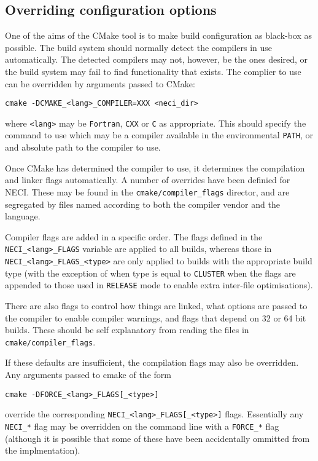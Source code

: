 \documentclass[a4paper,notitlepage,dvipsnames]{scrreprt}
\let\code\lstinline
\begin{document}
\subsection{Overriding configuration options}

    One of the aims of the CMake tool is to make build configuration as black-box as possible.
    The build system should normally detect the compilers in use automatically. The detected compilers
    may not, however, be the ones desired, or the build system may fail to find functionality that
    exists. The complier to use can be overridden by arguments passed to CMake:
    \begin{lstlisting}[gobble=4]
        cmake -DCMAKE_<lang>_COMPILER=XXX <neci_dir>
    \end{lstlisting}
    where \code{<lang>} may be \code{Fortran}, \code{CXX} or \code{C} as appropriate. This should
    specify the command to use which may be a compiler available in the environmental \code{PATH},
    or and absolute path to the compiler to use.

    Once CMake has determined the compiler to use, it determines the compilation and linker flags
    automatically. A number of overrides have been definied for NECI. These may be found in the
    \code{cmake/compiler_flags} director, and are segregated by files named according to both the
    compiler vendor and the language.

    Compiler flags are added in a specific order. The flags defined in the \code{NECI_<lang>_FLAGS}
    variable are applied to all builds, whereas those in \code{NECI_<lang>_FLAGS_<type>} are only
    applied to builds with the appropriate build type (with the exception of when type is equal to
    \code{CLUSTER} when the flags are appended to those used in \code{RELEASE} mode to enable
    extra inter-file optimisations).

    There are also flags to control how things are linked, what options are passed to the compiler
    to enable compiler warnings, and flags that depend on 32 or 64 bit builds. These should be
    self explanatory from reading the files in \code{cmake/compiler_flags}.

    If these defaults are insufficient, the compilation flags may also be overridden. Any arguments
    passed to cmake of the form
    \begin{lstlisting}[gobble=4]
        cmake -DFORCE_<lang>_FLAGS[_<type>]
    \end{lstlisting}
    override the corresponding \code{NECI_<lang>_FLAGS[_<type>]} flags. Essentially any
    \code{NECI_*} flag may be overridden on the command line with a \code{FORCE_*} flag (although
    it is possible that some of these have been accidentally ommitted from the implmentation).
\end{document}
